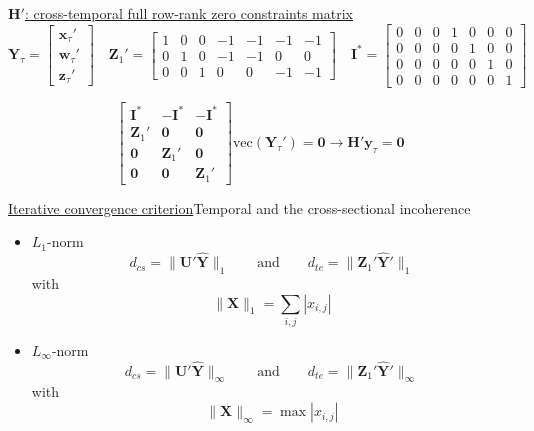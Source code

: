 \documentclass[aspectratio=169, table,colorlinks]{beamer}
\newcommand{\wvet}{\bm{w}}
\newcommand{\xvet}{\bm{x}}
\newcommand{\yvet}{\bm{y}}
\newcommand{\zvet}{\bm{z}}
\newcommand{\Hvet}{\bm{H}}
\newcommand{\Ivet}{\bm{I}}
\newcommand{\Uvet}{\bm{U}}
\newcommand{\Xvet}{\bm{X}}
\newcommand{\Yvet}{\bm{Y}}
\newcommand{\Zvet}{\bm{Z}}
\newcommand{\Zerovet}{\bm{0}}
\newcommand\norm[1]{\lVert#1\rVert}
\begin{document}
\begin{frame}[label = {app:ctH}]{\hyperlink{cap:ctreco}{\color{white}$\Hvet'$: cross-temporal full row-rank zero constraints matrix}}
		$$
	\Yvet_{\tau} = \begin{bmatrix} \xvet_{\tau}' \\ \wvet_{\tau}' \\ \zvet_{\tau}' \end{bmatrix} \quad 
	\Zvet_1' = \begin{bmatrix} 1 & 0 & 0 & -1 & -1 & -1 & -1 \\
			                   0 & 1 & 0 & -1 & -1 &  0 &  0 \\
			                   0 & 0 & 1 &  0 &  0 & -1 & -1 \end{bmatrix} \quad
	\Ivet^* = \begin{bmatrix} 0 & 0 & 0 & 1 & 0 & 0 & 0 \\
			                  0 & 0 & 0 & 0 & 1 & 0 & 0 \\
			                  0 & 0 & 0 & 0 & 0 & 1 & 0 \\
			                  0 & 0 & 0 & 0 & 0 & 0 & 1 \end{bmatrix}
	$$

	$$
		\begin{bmatrix}
		\Ivet^* & -\Ivet^* & -\Ivet^* \\
		\Zvet_1' & \Zerovet & \Zerovet \\
		\Zerovet & \Zvet_1' & \Zerovet \\
		\Zerovet & \Zerovet & \Zvet_1'		
		\end{bmatrix}\text{vec}\left(\Yvet_{\tau}'\right) = \Zerovet \longrightarrow \Hvet'\yvet_\tau = \Zerovet
			$$
\end{frame}

\begin{frame}[label = {app:itconv}]{\hyperlink{cap:ite}{\color{white}Iterative convergence criterion}}{Temporal and the cross-sectional incoherence}
	\begin{itemize}
		\item $L_1$-norm
		$$d_{cs} = \norm{\Uvet'\widehat{\Yvet}}_1 \qquad \text{and} \qquad d_{te} = \norm{\Zvet_1'\widehat{\Yvet}'}_1$$
		with $$\norm{\Xvet}_1 = \sum_{i,j}|x_{i,j}|$$
		\item $L_\infty$-norm
		$$d_{cs} = \norm{\Uvet'\widehat{\Yvet}}_\infty \qquad \text{and} \qquad d_{te} = \norm{\Zvet_1'\widehat{\Yvet}'}_\infty$$
		with $$\norm{\Xvet}_\infty = \max |x_{i,j}|$$
	\end{itemize}

\end{frame}
\end{document}
